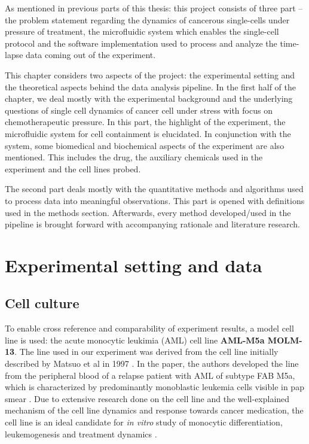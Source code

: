 \documentclass[pdftex,12pt,a4paper]{report}
\begin{document}
As mentioned in previous parts of this thesis: this project consists of three part -- the problem statement regarding the dynamics of cancerous single-cells under pressure of treatment, the microfluidic system which enables the single-cell protocol and the software implementation used to process and analyze the time-lapse data coming out of the experiment. 

This chapter considers two aspects of the project: the experimental setting and the theoretical aspects behind the data analysis pipeline. In the first half of the chapter, we deal mostly with the experimental background and the underlying questions of single cell dynamics of cancer cell under stress with focus on chemotherapeutic pressure. In this part, the highlight of the experiment, the microfluidic system for cell containment is elucidated. In conjunction with the system, some biomedical and biochemical aspects of the experiment are also mentioned. This includes the drug, the auxiliary chemicals used in the experiment and the cell lines probed.

The second part deals mostly with the quantitative methods and algorithms used to process data into meaningful observations. This part is opened with definitions used in the methods section. Afterwards, every method developed/used in the pipeline is brought forward with accompanying rationale and literature research.

\section{Experimental setting and data}

\subsection{Cell culture}
\label{subsection:cell_culture}

To enable cross reference and comparability of experiment results, a model cell line is used: the acute monocytic leukimia (AML) cell line \textbf{AML-M5a MOLM-13}. The line used in our experiment was derived from the cell line initially described by Matsuo et al in 1997 \cite{matsuo1997two}. In the paper, the authors developed the line from the peripheral blood of a relapse patient with AML of subtype FAB M5a, which is characterized by predominantly monoblastic leukemia cells visible in pap smear \cite{arber20162016}. Due to extensive research done on the cell line and the well-explained mechanism of the cell line dynamics and response towards cancer medication, the cell line is an ideal candidate for \textit{in vitro} study of monocytic differentiation, leukemogenesis and treatment dynamics \cite{matsuo1997two, kelly2002ct53518, yokota1997internal}.
\end{document}
